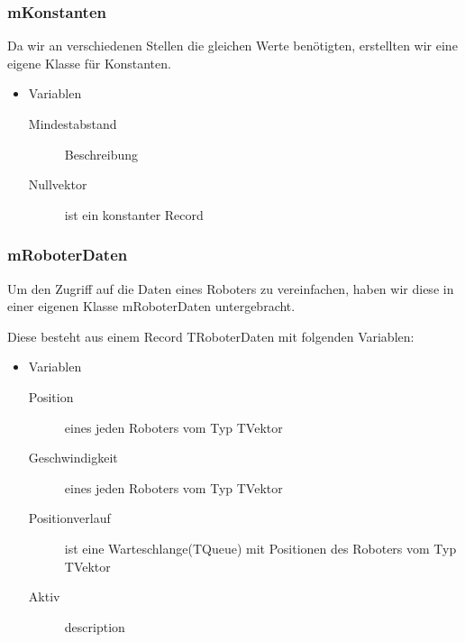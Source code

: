 \subsubsection{mKonstanten}
Da wir an verschiedenen Stellen die gleichen Werte benötigten, erstellten wir eine eigene Klasse für Konstanten.
\begin{itemize}
	\item Variablen
	\begin{description}
		\item[Mindestabstand] Beschreibung
		\item[Nullvektor] ist ein konstanter Record
	\end{description}
\end{itemize}

\subsubsection{mRoboterDaten}
Um den Zugriff auf die Daten eines Roboters zu vereinfachen, haben wir diese in einer eigenen Klasse mRoboterDaten untergebracht.

Diese besteht aus einem Record TRoboterDaten mit folgenden Variablen:
\begin{itemize}
	\item Variablen
	\begin{description}
		\item[Position] eines jeden Roboters vom Typ TVektor 
		\item[Geschwindigkeit] eines jeden Roboters vom Typ TVektor
		\item[Positionverlauf] ist eine Warteschlange(TQueue) mit Positionen des Roboters vom Typ TVektor
		\item[Aktiv] description
	\end{description}
\end{itemize}


%
%
%
